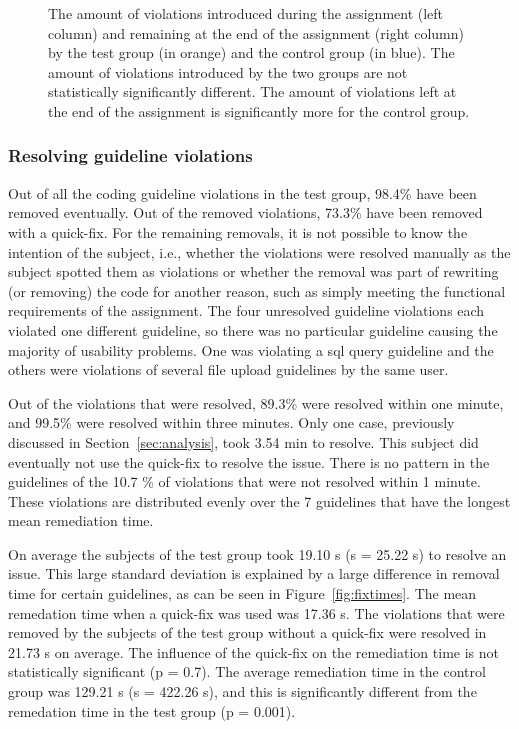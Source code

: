 \begin{figure}
\begin{subfigure}[t]{.49\textwidth}
  \end{subfigure}
  \label{fig:hist-test-control}
  \caption[]{The amount of violations introduced during the assignment (left column) and remaining at the end of the assignment (right column) by the test group (in orange) and the control group (in blue). The amount of violations introduced by the two groups are not statistically significantly different. The amount of violations left at the end of the assignment is significantly more for the control group.}
\end{figure}

\subsubsection{Resolving guideline violations}
Out of all the coding guideline violations in the test group, 98.4\% have been removed eventually.
Out of the removed violations, 73.3\% have been removed with a quick-fix.
For the remaining removals, it is not possible to know the intention of the subject, i.e., whether the violations were resolved manually as the subject spotted them as violations or whether the removal was part of rewriting (or removing) the code for another reason, such as simply meeting the functional requirements of the assignment.
The four unresolved guideline violations each violated one different guideline, so there was no particular guideline causing the majority of usability problems.
One was violating a \gls{sql} query guideline and the others were violations of several file upload guidelines by the same user.

Out of the violations that were resolved, 89.3\% were resolved within one minute, and 99.5\% were resolved within three minutes.
Only one case, previously discussed in Section~\ref{sec:analysis}, took 3.54 min to resolve.
This subject did eventually not use the quick-fix to resolve the issue.
There is no pattern in the guidelines of the 10.7 \% of violations that were not resolved within 1 minute.
These violations are distributed evenly over the 7 guidelines that have the longest mean remediation time.

On average the subjects of the test group took 19.10 s (s = 25.22 s) to resolve an issue.
This large standard deviation is explained by a large difference in removal time for certain guidelines, as can be seen in Figure~\ref{fig:fixtimes}.
The mean remedation time when a quick-fix was used was 17.36 s.
The violations that were removed by the subjects of the test group without a quick-fix were resolved in 21.73 s on average.
The influence of the quick-fix on the remediation time is not statistically significant (p = 0.7).
The average remediation time in the control group was 129.21 s (s = 422.26 s), and this is significantly different from the remedation time in the test group (p = 0.001).

